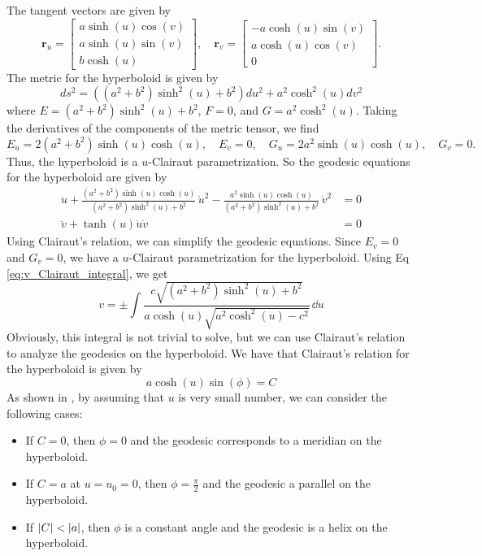 \documentclass[12pt]{article}
\begin{document}
The tangent vectors are given by
\[
    \mathbf{r}_u = \begin{bmatrix} a \sinh (u) \cos (v) \\ a \sinh (u) \sin (v) \\ b \cosh (u) \end{bmatrix}, \quad \mathbf{r}_v = \begin{bmatrix} -a \cosh (u) \sin (v) \\ a \cosh (u) \cos (v) \\ 0 \end{bmatrix}.
\]
The metric for the hyperboloid is given by
\[
    ds^2 = ((a^2 + b^2)\sinh^{2}(u) + b^2) du^2 + a^2 \cosh^{2}(u) dv^2
\]
where \(E = (a^2 + b^2)\sinh^{2}(u) + b^2\), \(F = 0\), and \(G = a^2 \cosh^{2}(u)\).
Taking the derivatives of the components of the metric tensor, we find
\[
    E_u = 2(a^2 + b^2)\sinh(u)\cosh(u), \quad E_v = 0, \quad G_u = 2a^2 \sinh(u) \cosh(u), \quad G_v = 0.
\]
Thus, the hyperboloid is a $u$-Clairaut parametrization.
So the geodesic equations for the hyperboloid are given by
\begin{align*}
    \ddot{u} + \frac{(a^2 + b^2)\sinh(u)\cosh(u)}{(a^2 + b^2)\sinh^{2}(u) + b^2}\,\dot{u}^2 - \frac{a^2 \sinh(u) \cosh(u)}{(a^2 + b^2)\sinh^{2}(u) + b^2}\,\dot{v}^{2} &= 0 \\
    \ddot{v} + \tanh(u) \dot{u} \dot{v} &= 0
\end{align*}
Using Clairaut's relation, we can simplify the geodesic equations.
Since $E_v = 0$ and $G_v = 0$, we have a $u$-Clairaut parametrization for the hyperboloid.
Using Eq \eqref{eq:v_Clairaut_integral}, we get
\[
    v = \pm \int \frac{c\sqrt{(a^2 + b^2)\sinh^2(u) + b^2}}{a\cosh(u)\sqrt{a^2\cosh^2(u) - c^2}}\,\dd{u}
\]
Obviously, this integral is not trivial to solve, but we can use Clairaut's relation to analyze the geodesics on the hyperboloid.
We have that Clairaut's relation for the hyperboloid is given by
\[
    a \cosh(u) \sin(\phi) = C  
\]
As shown in \cite{khuangsatung2012geodesics}, by assuming that $u$ is very small number, we can consider the following cases:
\begin{itemize}
    \item If $C = 0$, then $\phi = 0$ and the geodesic corresponds to a meridian on the hyperboloid.
    \item If $C = a$ at $u = u_0 = 0$, then $\phi = \frac{\pi}{2}$ and the geodesic a parallel on the hyperboloid.
    \item If $\abs{C} < \abs{a}$, then $\phi$ is a constant angle and the geodesic is a helix on the hyperboloid.
\end{itemize}
\end{document}
